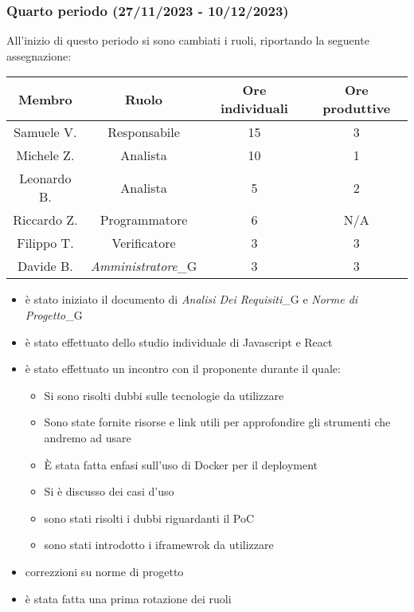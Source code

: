 \subsubsection{Quarto periodo (27/11/2023 - 10/12/2023)}
All'inizio di questo periodo si sono cambiati i ruoli, riportando la seguente assegnazione:

\vspace{10 mm}
\begin{tabular}{|c|c|c|c|}
\hline
\textbf{Membro} & \textbf{Ruolo} & \textbf{Ore individuali} & \textbf{Ore produttive} \\
\hline
Samuele V. & Responsabile & 15 & 3 \\
\hline
Michele Z. & Analista & 10 & 1 \\
\hline
Leonardo B. & Analista & 5 & 2 \\
\hline
Riccardo Z. & Programmatore & 6 & N/A \\
\hline
Filippo T. & Verificatore & 3 & 3 \\
\hline
Davide B. & \textit{Amministratore}_G & 3 & 3 \\
\hline
\end{tabular}
\vspace{10 mm}

\begin{itemize}
    \item è stato iniziato il documento di \textit{Analisi Dei Requisiti}_G e \textit{Norme di Progetto}_G
    \item è stato effettuato dello studio individuale di Javascript e React
    \item è stato effettuato un incontro con il proponente durante il quale:
    \begin{itemize}
        \item Si sono risolti dubbi sulle tecnologie da utilizzare
        \item Sono state fornite risorse e link utili per approfondire gli strumenti che andremo ad usare
        \item È stata fatta enfasi sull'uso di Docker per il deployment
        \item Si è discusso dei casi d'uso
        \item sono stati risolti i dubbi riguardanti il PoC
        \item sono stati introdotto i iframewrok da utilizzare
    \end{itemize}
    \item correzzioni su norme di progetto
    \item è stata fatta una prima rotazione dei ruoli
\end{itemize}

